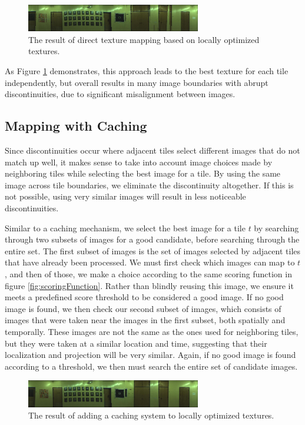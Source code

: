\documentclass[10pt,twocolumn,letterpaper]{article}
\begin{document}
\begin{figure}
  \centering
  \includegraphics[width=3in]{wall1_naive.jpg}
  \caption{The result of direct texture mapping based on locally
    optimized textures.}
  \label{fig:directMapping}
\end{figure}


As Figure \ref{fig:directMapping} demonstrates, this approach leads to
the best texture for each tile independently, but overall results in
many image boundaries with abrupt discontinuities, due to significant
misalignment between images.

\subsection{Mapping with Caching}
Since discontinuities occur where adjacent tiles select different
images that do not match up well, it makes sense to take into account
image choices made by neighboring tiles while selecting the best image
for a tile. By using the same image across tile boundaries, we
eliminate the discontinuity altogether. If this is not possible, using
very similar images will result in less noticeable discontinuities.

Similar to a caching mechanism, we select the best image for a tile
$t$ by searching through two subsets of images for a good candidate,
before searching through the entire set. The first subset of images is
the set of images selected by adjacent tiles that have already been
processed. We must first check which images can map to $t$, and then
of those, we make a choice according to the same scoring function in
figure \ref{fig:scoringFunction}. Rather than blindly reusing this
image, we ensure it meets a predefined score threshold to be
considered a good image. If no good image is found, we then check our
second subset of images, which consists of images that were taken near
the images in the first subset, both spatially and temporally. These
images are not the same as the ones used for neighboring tiles, but
they were taken at a similar location and time, suggesting that their
localization and projection will be very similar. Again, if no good
image is found according to a threshold, we then must search the
entire set of candidate images.

\begin{figure}
  \centering
  \includegraphics[width=3in]{wall1_cache_full.jpg}
  \caption{The result of adding a caching system to locally optimized
    textures.}
  \label{fig:caching}
\end{figure}
\end{document}
